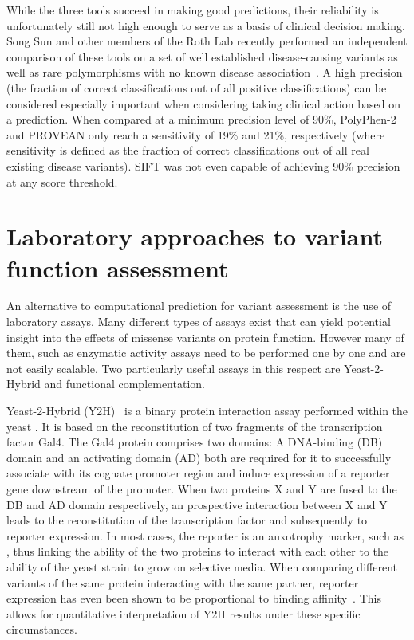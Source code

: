 While the three tools succeed in making good predictions, their reliability is unfortunately still not high enough to serve as a basis of clinical decision making. Song Sun and other members of the Roth Lab recently performed an independent comparison of these tools on a set of well established disease-causing variants as well as rare polymorphisms with no known disease association~\cite{sun_extended_2016}. A high precision (the fraction of correct classifications out of all positive classifications) can be considered especially important when considering taking clinical action based on a prediction. When compared at a minimum precision level of 90\%, PolyPhen-2 and PROVEAN only reach a sensitivity of 19\% and 21\%, respectively (where sensitivity is defined as the fraction of correct classifications out of all real existing disease variants). SIFT was not even capable of achieving 90\% precision at any score threshold.

\section{Laboratory approaches to variant function assessment}

An alternative to computational prediction for variant assessment is the use of laboratory assays. Many different types of assays exist that can yield potential insight into the effects of missense variants on protein function. However many of them, such as enzymatic activity assays need to be performed one by one and are not easily scalable. Two particularly useful assays in this respect are Yeast-2-Hybrid and functional complementation.

Yeast-2-Hybrid (Y2H)~\cite{fields_novel_1989} is a binary protein interaction assay performed within the yeast . It is based on the reconstitution of two fragments of the transcription factor Gal4. The Gal4 protein comprises two domains: A DNA-binding (DB) domain and an activating domain (AD) both are required for it to successfully associate with its cognate promoter region and induce expression of a reporter gene downstream of the promoter. When two proteins X and Y are fused to the DB and AD domain respectively, an prospective interaction between X and Y leads to the reconstitution of the transcription factor and subsequently to reporter expression. In most cases, the reporter is an auxotrophy marker, such as , thus linking the ability of the two proteins to interact with each other to the ability of the yeast strain to grow on selective media. When comparing different variants of the same protein interacting with the same partner, reporter expression has even been shown to be proportional to binding affinity~\cite{yang_protein-peptide_1995}. This allows for quantitative interpretation of Y2H results under these specific circumstances. 

